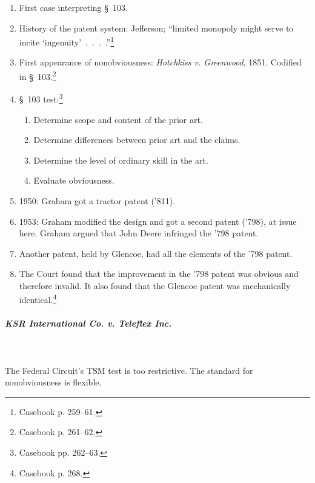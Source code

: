 \begin{enumerate}
    \item First case interpreting \S\ 103.
    \item History of the patent system: Jefferson; \enquote{limited monopoly 
    might serve to incite \enquote{ingenuity}~.~.~.~.}\footnote{Casebook p. 
    259--61.}
    \item First appearance of nonobviousness: \emph{Hotchkiss v. Greenwood}, 
    1851. Codified in \S\ 103.\footnote{Casebook p. 261--62.}
    \item \S\ 103 test:\footnote{Casebook pp. 262--63.}
    \begin{enumerate}
        \item Determine scope and content of the prior art.
        \item Determine differences between prior art and the claims.
        \item Determine the level of ordinary skill in the art.
        \item Evaluate obviousness.
    \end{enumerate}
    \item 1950: Graham got a tractor patent ('811).
    \item 1953: Graham modified the design and got a second patent ('798), at 
    issue here. Graham argued that John Deere infringed the '798 patent.
    \item Another patent, held by Glencoe, had all the elements of the '798 
    patent.
    \item The Court found that the improvement in the '798 patent was obvious 
    and therefore invalid. It also found that the Glencoe patent was 
    mechanically identical.\footnote{Casebook p. 268.}
\end{enumerate}

\paragraph{\emph{KSR International Co. v. Teleflex Inc.}}
~\\\\
The Federal Circuit's TSM test is too restrictive. The standard for 
nonobviousness is flexible.

